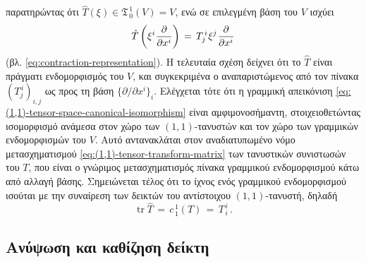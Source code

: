 \documentclass[11pt,a4paper,twoside,openright]{book}
\begin{document}
παρατηρώντας ότι $\hat{T}(\xi) \in \mathfrak{T}^{\,1}_{\,0}(V) = V$,
ενώ σε επιλεγμένη βάση του $V$ ισχύει
\begin{equation*}
\hat{T}\left(\xi^i\hspace{.3pt}\frac{\partial}{\partial x^i}\right)
\,=\,
T^{\,i}_j\hspace{.5pt}\xi^j\hspace{.5pt}\frac{\partial}{\partial x^i}
\end{equation*}
(βλ. \eqref{eq:contraction-representation}).
H τελευταία σχέση δείχνει ότι το $\hat{T}$ είναι πράγματι ενδομορφισμός του $V$, και συγκεκριμένα ο αναπαριστώμενος από τον πίνακα $(T^{\,i}_j)_{i,j}$ ως προς τη βάση $\{\partial/\partial x^i\}_i$.
Ελέγχεται τότε ότι η γραμμική απεικόνιση
\eqref{eq:(1,1)-tensor-space-canonical-isomorphism}
είναι αμφιμονοσήμαντη, στοιχειοθετώντας ισομορφισμό ανάμεσα στον χώρο των $(1,1)$-τανυστών και τον χώρο των γραμμικών ενδομορφισμών του $V$.
Αυτό αντανακλάται στον αναδιατυπωμένο νόμο μετασχηματισμού \eqref{eq:(1,1)-tensor-transform-matrix} των τανυστικών συνιστωσών του $T$,
που είναι ο γνώριμος μετασχηματισμός πίνακα γραμμικού ενδομορφισμού κάτω από αλλαγή βάσης. Σημειώνεται τέλος ότι το ίχνος ενός γραμμικού ενδομορφισμού ισούται με την συναίρεση των δεικτών του αντίστοιχου $(1,1)$-τανυστή, δηλαδή
\begin{equation*}
\operatorname{tr} \hat{T}\,=\,c^{\,1}_{\,1}(T)\,=\,T^{\,i}_{\,i}\,.
\end{equation*}

\subsection{Ανύψωση και καθίζηση δείκτη}
	\label{sec:raising-and-lowering-index}
\end{document}
